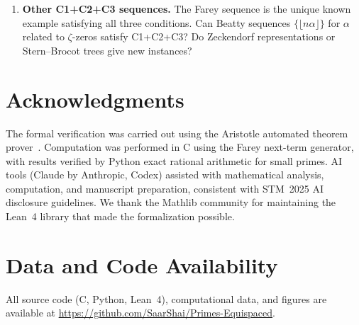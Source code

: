 \documentclass[11pt]{article}
\theoremstyle{definition}
\begin{document}
\begin{enumerate}
  \item \textbf{Other C1+C2+C3 sequences.}
    The Farey sequence is the unique known example satisfying all
    three conditions.  Can Beatty sequences $\{\lfloor n\alpha\rfloor\}$
    for $\alpha$ related to $\zeta$-zeros satisfy C1+C2+C3?  Do
    Zeckendorf representations or Stern--Brocot trees give new instances?
\end{enumerate}


\section*{Acknowledgments}

The formal verification was carried out using the Aristotle
automated theorem prover~\cite{Aristotle2025}.
Computation was performed in C using the Farey next-term
generator, with results verified by Python exact rational
arithmetic for small primes.
AI tools (Claude by Anthropic, Codex) assisted with
mathematical analysis, computation, and manuscript preparation,
consistent with STM~2025 AI disclosure guidelines.
We thank the Mathlib community for maintaining the Lean~4
library that made the formalization possible.


\section*{Data and Code Availability}

All source code (C, Python, Lean~4), computational data, and
figures are available at
\url{https://github.com/SaarShai/Primes-Equispaced}.

\end{document}
